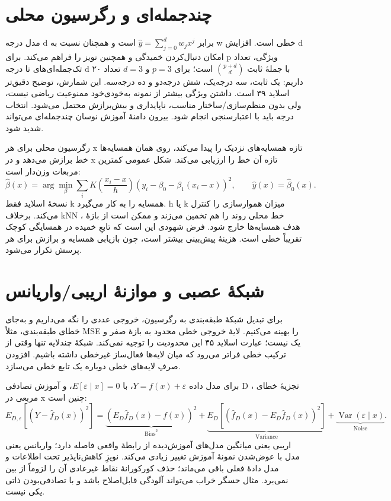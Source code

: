 \documentclass[12pt,a4paper,oneside]{report}
\begin{document}
\section{چندجمله‌ای و رگرسیون محلی}

مدل درجه d برابر \(\widehat y=\sum_{j=0}^d w_jx^j\) است و همچنان نسبت به w خطی است. افزایش d امکان دنبال‌کردن خمیدگی و همچنین نویز را فراهم می‌کند. برای p ویژگی، تعداد تک‌جمله‌ای‌های تا درجه d با جملهٔ ثابت \(\binom{p+d}{d}\) است؛ برای $p=3$ و $d=3$ تعداد ۲۰ داریم: یک ثابت، سه درجه‌یک، شش درجه‌دو و ده درجه‌سه. این شمارش، توضیح دقیق‌تر اسلاید ۳۹ است. داشتن ویژگی بیشتر از نمونه به‌خودی‌خود ممنوعیت ریاضی نیست، ولی بدون منظم‌سازی/ساختار مناسب، ناپایداری و بیش‌برازش محتمل می‌شود. انتخاب درجه باید با اعتبارسنجی انجام شود. بیرون دامنهٔ آموزش نوسان چندجمله‌ای می‌تواند شدید شود.

رگرسیون محلی برای هر x تازه همسایه‌های نزدیک را پیدا می‌کند، روی همان همسایه‌ها خط برازش می‌دهد و در x تازه آن خط را ارزیابی می‌کند. شکل عمومی کمترین مربعات وزن‌دار است: \[
\widehat\beta(x)=\arg\min_\beta\sum_i K\!\left(\frac{x_i-x}{h}\right)(y_i-\beta_0-\beta_1(x_i-x))^2,
\qquad\widehat y(x)=\widehat\beta_0(x).
\] نسخهٔ اسلاید فقط k همسایه را به کار می‌گیرد. h یا k میزان هموارسازی را کنترل می‌کند. برخلاف kNN ، خط محلی روند را هم تخمین می‌زند و ممکن است از بازهٔ هدف همسایه‌ها خارج شود. فرض شهودی این است که تابعِ خمیده در همسایگی کوچک تقریباً خطی است. هزینهٔ پیش‌بینی بیشتر است، چون بازیابی همسایه و برازش برای هر پرسش تکرار می‌شود.

\section{شبکهٔ عصبی و موازنهٔ اریبی/واریانس}

برای تبدیل شبکهٔ طبقه‌بندی به رگرسیون، خروجی عددی را نگه می‌داریم و به‌جای خطای طبقه‌بندی، مثلاً MSE را بهینه می‌کنیم. لایهٔ خروجی خطی محدود به بازهٔ صفر و یک نیست؛ عبارت اسلاید ۴۵ این محدودیت را توجیه نمی‌کند. شبکهٔ چندلایه تنها وقتی از ترکیب خطی فراتر می‌رود که میان لایه‌ها فعال‌ساز غیرخطی داشته باشیم. افزودن صرفِ لایه‌های خطی دوباره یک تابع خطی می‌سازد.

برای مدل داده \(Y=f(x)+\varepsilon\)، با \(E[\varepsilon\mid x]=0\)، و آموزش تصادفی D ، تجزیهٔ خطای مربعی در x چنین است: \[
E_{D,\varepsilon}[(Y-\widehat f_D(x))^2]
=\underbrace{(E_D\widehat f_D(x)-f(x))^2}_{\mathrm{Bias}^2}
+\underbrace{E_D[(\widehat f_D(x)-E_D\widehat f_D(x))^2]}_{\mathrm{Variance}}
+\underbrace{\operatorname{Var}(\varepsilon\mid x)}_{\mathrm{Noise}}.
\] اریبی یعنی میانگین مدل‌های آموزش‌دیده از رابطهٔ واقعی فاصله دارد؛ واریانس یعنی مدل با عوض‌شدن نمونهٔ آموزش تغییر زیادی می‌کند. نویزِ کاهش‌ناپذیر تحت اطلاعات و مدل دادهٔ فعلی باقی می‌ماند؛ حذف کورکورانهٔ نقاط غیرعادی آن را لزوماً از بین نمی‌برد. مثال حسگر خراب می‌تواند آلودگی قابل‌اصلاح باشد و با تصادفی‌بودن ذاتی یکی نیست.
\end{document}
